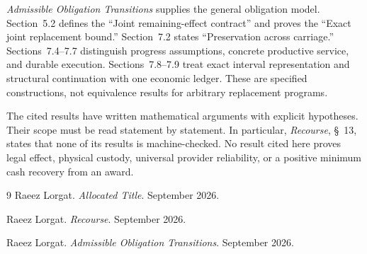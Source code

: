 \documentclass{momentum}
\begin{document}
\emph{Admissible Obligation Transitions} supplies the general obligation model. Section~5.2 defines the ``Joint remaining-effect contract'' and proves the ``Exact joint replacement bound.'' Section~7.2 states ``Preservation across carriage.'' Sections~7.4--7.7 distinguish progress assumptions, concrete productive service, and durable execution. Sections~7.8--7.9 treat exact interval representation and structural continuation with one economic ledger. These are specified constructions, not equivalence results for arbitrary replacement programs.

The cited results have written mathematical arguments with explicit hypotheses. Their scope must be read statement by statement. In particular, \emph{Recourse}, \S~13, states that none of its results is machine-checked. No result cited here proves legal effect, physical custody, universal provider reliability, or a positive minimum cash recovery from an award.

\begin{thebibliography}{9}
Raeez Lorgat. \emph{Allocated Title}. September 2026.

Raeez Lorgat. \emph{Recourse}. September 2026.

Raeez Lorgat. \emph{Admissible Obligation Transitions}. September 2026.
\end{thebibliography}
\end{document}
